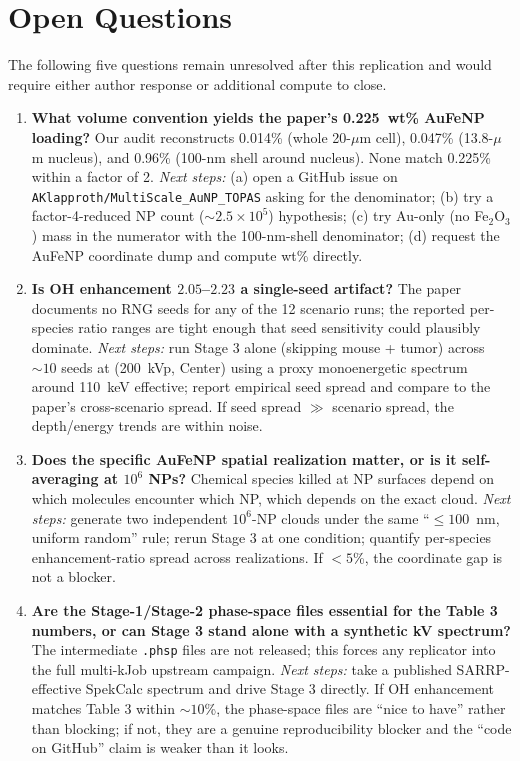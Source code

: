 \section{Open Questions}

The following five questions remain unresolved after this replication and would
require either author response or additional compute to close.

\begin{enumerate}

\item \textbf{What volume convention yields the paper's 0.225~wt\% AuFeNP loading?}
Our audit reconstructs 0.014\% (whole 20-$\mu$m cell), 0.047\% (13.8-$\mu$m
nucleus), and 0.96\% (100-nm shell around nucleus). None match 0.225\% within
a factor of 2.
\emph{Next steps:} (a) open a GitHub issue on
\verb|AKlapproth/MultiScale_AuNP_TOPAS| asking for the denominator; (b) try a
factor-4-reduced NP count ($\sim 2.5\times 10^5$) hypothesis; (c) try Au-only
(no Fe$_2$O$_3$) mass in the numerator with the 100-nm-shell denominator;
(d) request the AuFeNP coordinate dump and compute wt\% directly.

\item \textbf{Is OH enhancement $2.05$--$2.23$ a single-seed artifact?}
The paper documents no RNG seeds for any of the 12 scenario runs; the reported
per-species ratio ranges are tight enough that seed sensitivity could plausibly
dominate.
\emph{Next steps:} run Stage 3 alone (skipping mouse + tumor) across
$\sim 10$ seeds at (200~kVp, Center) using a proxy monoenergetic spectrum
around 110~keV effective; report empirical seed spread and compare to the
paper's cross-scenario spread. If seed spread $\gg$ scenario spread, the
depth/energy trends are within noise.

\item \textbf{Does the specific AuFeNP spatial realization matter, or is it
self-averaging at $10^6$ NPs?}
Chemical species killed at NP surfaces depend on which molecules encounter
which NP, which depends on the exact cloud.
\emph{Next steps:} generate two independent $10^6$-NP clouds under the same
``$\leq 100$~nm, uniform random'' rule; rerun Stage 3 at one condition;
quantify per-species enhancement-ratio spread across realizations. If $<5$\%,
the coordinate gap is not a blocker.

\item \textbf{Are the Stage-1/Stage-2 phase-space files essential for the Table 3
numbers, or can Stage 3 stand alone with a synthetic kV spectrum?}
The intermediate \verb|.phsp| files are not released; this forces any replicator
into the full multi-kJob upstream campaign.
\emph{Next steps:} take a published SARRP-effective SpekCalc spectrum and drive
Stage 3 directly. If OH enhancement matches Table 3 within $\sim 10$\%, the
phase-space files are ``nice to have'' rather than blocking; if not, they are
a genuine reproducibility blocker and the ``code on GitHub'' claim is weaker
than it looks.


\end{enumerate}
